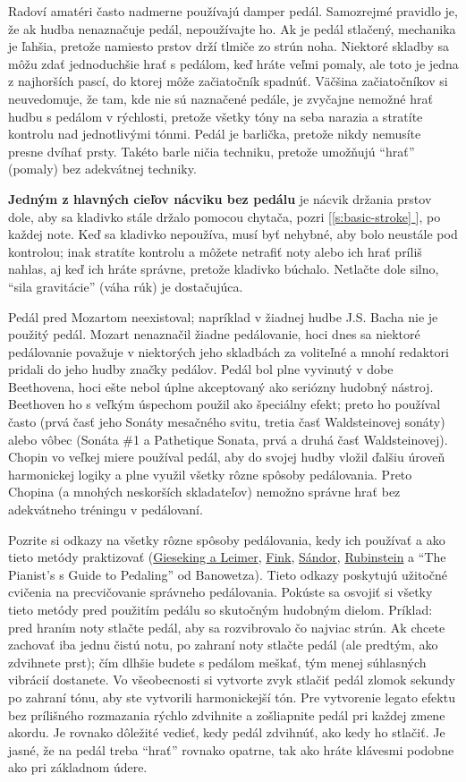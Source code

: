\documentclass[11pt,a4paper]{book}
\newcommand*{\fullref}[1]{\hyperref[{#1}]{\ref*{#1} \nameref*{#1}}} %
\newcommand*{\fullrefp}[1]{[\fullref{#1}]} %
\begin{document}
Radoví amatéri často nadmerne používajú damper pedál. Samozrejmé pravidlo je, že ak hudba nenaznačuje pedál, nepoužívajte ho. Ak je pedál stlačený, mechanika je ľahšia, pretože namiesto prstov drží tlmiče zo strún noha. Niektoré skladby sa môžu zdať jednoduchšie hrať s pedálom, keď hráte veľmi pomaly, ale toto je jedna z najhorších pascí, do ktorej môže začiatočník spadnúť. Väčšina začiatočníkov si neuvedomuje, že tam, kde nie sú naznačené pedále, je zvyčajne nemožné hrať hudbu s pedálom v rýchlosti, pretože všetky tóny na seba narazia a stratíte kontrolu nad jednotlivými tónmi. Pedál je barlička, pretože nikdy nemusíte presne dvíhať prsty. Takéto barle ničia techniku, pretože umožňujú “hrať” (pomaly) bez adekvátnej techniky.

\textbf{Jedným z hlavných cieľov nácviku bez pedálu} je nácvik držania prstov dole, aby sa kladivko stále držalo pomocou chytača, pozri \fullrefp{s:basic-stroke}, po každej note. Keď sa kladivko nepoužíva, musí byť nehybné, aby bolo neustále pod kontrolou; inak stratíte kontrolu a môžete netrafiť noty alebo ich hrať príliš nahlas, aj keď ich hráte správne, pretože kladivko búchalo. Netlačte dole silno, “sila gravitácie” (váha rúk) je dostačujúca.

Pedál pred Mozartom neexistoval; napríklad v žiadnej hudbe J.S. Bacha nie je použitý pedál. Mozart nenaznačil žiadne pedálovanie, hoci dnes sa niektoré pedálovanie považuje v niektorých jeho skladbách za voliteľné a mnohí redaktori pridali do jeho hudby značky pedálov. Pedál bol plne vyvinutý v dobe Beethovena, hoci ešte nebol úplne akceptovaný ako seriózny hudobný nástroj. Beethoven ho s veľkým úspechom použil ako špeciálny efekt; preto ho používal často (prvá časť jeho Sonáty mesačného svitu, tretia časť Waldsteinovej sonáty) alebo vôbec (Sonáta \#1 a Pathetique Sonata, prvá a druhá časť Waldsteinovej). Chopin vo veľkej miere používal pedál, aby do svojej hudby vložil ďalšiu úroveň harmonickej logiky a plne využil všetky rôzne spôsoby pedálovania. Preto Chopina (a mnohých neskorších skladateľov) nemožno správne hrať bez adekvátneho tréningu v pedálovaní.

Pozrite si odkazy na všetky rôzne spôsoby pedálovania, kedy ich používať a ako tieto metódy praktizovať (\hyperlink{r:gieseking}{Gieseking a Leimer}, \hyperlink{r:fink}{Fink}, \hyperlink{r:sandor}{Sándor}, \hyperlink{r:rubinstein}{Rubinstein} a “The Pianist’s s Guide to Pedaling” od Banowetza). Tieto odkazy poskytujú užitočné cvičenia na precvičovanie správneho pedálovania. Pokúste sa osvojiť si všetky tieto metódy pred použitím pedálu so skutočným hudobným dielom. Príklad: pred hraním noty stlačte pedál, aby sa rozvibrovalo čo najviac strún. Ak chcete zachovať iba jednu čistú notu, po zahraní noty stlačte pedál (ale predtým, ako zdvihnete prst); čím dlhšie budete s pedálom meškať, tým menej súhlasných vibrácií dostanete. Vo všeobecnosti si vytvorte zvyk stlačiť pedál zlomok sekundy po zahraní tónu, aby ste vytvorili harmonickejší tón. Pre vytvorenie legato efektu bez prílišného rozmazania rýchlo zdvihnite a zošliapnite pedál pri každej zmene akordu. Je rovnako dôležité vedieť, kedy pedál zdvihnúť, ako kedy ho stlačiť. Je jasné, že na pedál treba “hrať” rovnako opatrne, tak ako hráte klávesmi podobne ako pri základnom údere.
\end{document}
